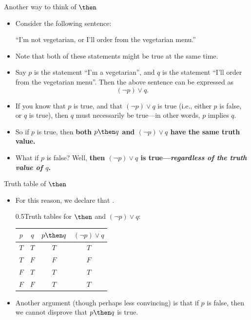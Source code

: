 \documentclass[12pt,aspectratio=1610, handout]{beamer}
\begin{document}
\begin{frame}{Another way to think of $\then$}
	\begin{itemize}
		\item Consider the following sentence: 
		\begin{center}
			``I'm not vegetarian, or I'll order from the vegetarian menu.''
		\end{center}
		\item Note that both of these statements might be true at the same time. 
		\item Say $p$ is the statement ``I'm a vegetarian'', and $q$ is the statement ``I'll order from the vegetarian menu''. Then the above sentence can be expressed as 
		\[
		(\neg p) \vee q.
		\]
		\item If you know that $p$ is true, and that $(\neg p) \vee q$ is true (i.e., either $p$ is false, or $q$ is true), then $q$ must necessarily be true---in other words, $p$ implies $q$. 
		\item So if $p$ is true, then \textbf{both $p \then q$ and $(\neg p) \vee q$ have the same truth value. }
		\item What if $p$ is false? Well, \textbf{then $(\neg p) \vee q$ is true---\emph{regardless of the truth value of $q$}. }
	\end{itemize}
\end{frame}






\begin{frame}{Truth table of $\then$}
	\begin{itemize}
	\item[\finger] For this reason, we declare that .
	\begin{center}\begin{blockz}{0.5}{Truth tables for $\then$ and $(\neg p) \vee q$:}
		\begin{tabular}{|c|c|c|c|}
			\hline
			$p$ & $q$ & $p \then q$ & $(\neg p) \vee q$\\
			\hline
			$T$ & $T$ & $T$ & $T$ \\
			\hline
			$T$ & $F$ & $F$ & $F$ \\
			\hline
			$F$ & $T$ & $T$ & $T$ \\ 
			\hline
			$F$ & $F$ & $T$ & $T$ \\
			\hline
		\end{tabular}\end{blockz}\p \vspace{2mm}
	\end{center}
	\item Another argument (though perhaps less convincing) is that if $p$ is false, then we cannot disprove that $p \then q$ is true. 
	\end{itemize} 
\end{frame}
\end{document}
